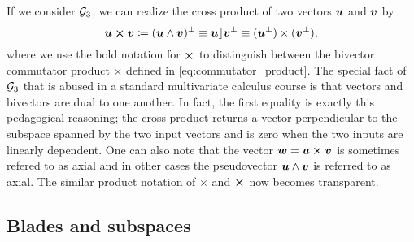 \begin{remark}
\label{rem:cross_product}
If we consider $\mathcal{G}_3$, we can realize the cross product of two vectors $\boldsymbol{u}$ and $\boldsymbol{v}$ by
\begin{equation}
\label{eq:cross_product}
\boldsymbol{u} \boldsymbol{\times} \boldsymbol{v} \coloneqq (\boldsymbol{u}\wedge \boldsymbol{v})^\perp \equiv \boldsymbol{u} \rfloor \boldsymbol{v}^\perp
\equiv (\boldsymbol{u}^\perp)\times (\boldsymbol{v}^\perp) , 
\end{equation}
where we use the bold notation for $\boldsymbol{\times}$ to distinguish between the bivector commutator product $\times$ defined in \cref{eq:commutator_product}. The special fact of $\mathcal{G}_3$ that is abused in a standard multivariate calculus course is that vectors and bivectors are dual to one another. In fact, the first equality is exactly this pedagogical reasoning; the cross product returns a vector perpendicular to the subspace spanned by the two input vectors and is zero when the two inputs are linearly dependent. One can also note that the vector $\boldsymbol{w}=\boldsymbol{u}\boldsymbol{\times} \boldsymbol{v}$ is sometimes refered to as axial and in other cases the pseudovector $\boldsymbol{u}\wedge \boldsymbol{v}$ is referred to as axial. The similar product notation of $\times$ and $\boldsymbol{\times}$ now becomes transparent. 
\end{remark}


\subsection{Blades and subspaces}
\label{subsubsec:blades_and_subspaces}

